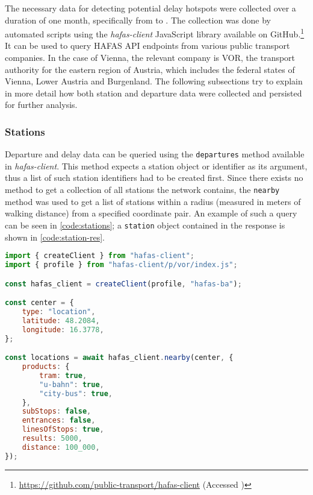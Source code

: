 The necessary data for detecting potential delay hotspots were collected over a duration of one month, specifically from  to .
The collection was done by automated scripts using the \textit{hafas-client} JavaScript library available on GitHub.\footnote{\url{https://github.com/public-transport/hafas-client} (Accessed )} It can be used to query \ac{HAFAS} \ac{API} endpoints from various public transport companies. In the case of Vienna, the relevant company is \ac{VOR}, the transport authority for the eastern region of Austria, which includes the federal states of Vienna, Lower Austria and Burgenland. The following subsections try to explain in more detail how both station and departure data were collected and persisted for further analysis.

\subsubsection{Stations}

Departure and delay data can be queried using the \texttt{departures} method available in \textit{hafas-client}. This method expects a station object or identifier as its argument, thus a list of such station identifiers had to be created first. Since there exists no method to get a collection of all stations the network contains, the \texttt{nearby} method was used to get a list of stations within a radius (measured in meters of walking distance) from a specified coordinate pair. An example of such a query can be seen in \cref{code:stations}; a \texttt{station} object contained in the response is shown in \cref{code:station-res}. 

\begin{lstlisting}[language=JavaScript, caption={Retrieving nearby stations from given coordinates}, label={code:stations}]
import { createClient } from "hafas-client";
import { profile } from "hafas-client/p/vor/index.js";

const hafas_client = createClient(profile, "hafas-ba");

const center = {
    type: "location",
    latitude: 48.2084,
    longitude: 16.3778,
};

const locations = await hafas_client.nearby(center, {
	products: {
		tram: true,
		"u-bahn": true,
		"city-bus": true,
	},
	subStops: false,
	entrances: false,
	linesOfStops: true,
	results: 5000,
	distance: 100_000,
});
\end{lstlisting}

